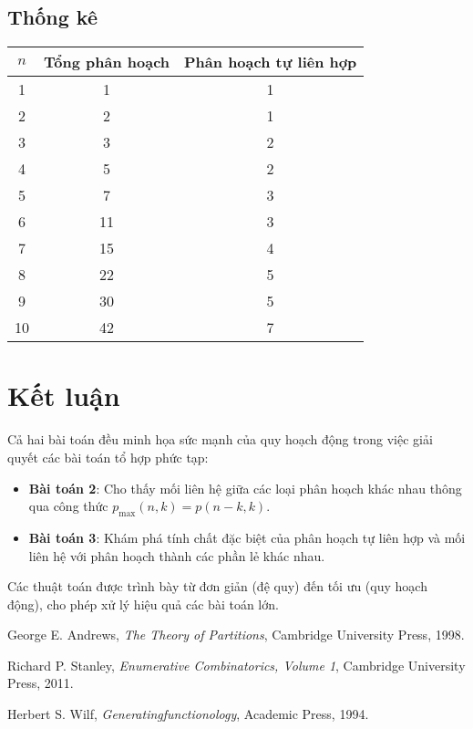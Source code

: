 \documentclass[12pt,a4paper]{article}
\theoremstyle{definition}
\begin{document}
\subsection{Thống kê}

\begin{center}
\begin{tabular}{|c|c|c|}
\hline
$n$ & Tổng phân hoạch & Phân hoạch tự liên hợp \\
\hline
1 & 1 & 1 \\
\hline
2 & 2 & 1 \\
\hline
3 & 3 & 2 \\
\hline
4 & 5 & 2 \\
\hline
5 & 7 & 3 \\
\hline
6 & 11 & 3 \\
\hline
7 & 15 & 4 \\
\hline
8 & 22 & 5 \\
\hline
9 & 30 & 5 \\
\hline
10 & 42 & 7 \\
\hline
\end{tabular}
\end{center}

\section{Kết luận}

Cả hai bài toán đều minh họa sức mạnh của quy hoạch động trong việc giải quyết các bài toán tổ hợp phức tạp:

\begin{itemize}
\item \textbf{Bài toán 2}: Cho thấy mối liên hệ giữa các loại phân hoạch khác nhau thông qua công thức $p_{\max}(n,k) = p(n-k, k)$.

\item \textbf{Bài toán 3}: Khám phá tính chất đặc biệt của phân hoạch tự liên hợp và mối liên hệ với phân hoạch thành các phần lẻ khác nhau.
\end{itemize}

Các thuật toán được trình bày từ đơn giản (đệ quy) đến tối ưu (quy hoạch động), cho phép xử lý hiệu quả các bài toán lớn.

\begin{thebibliography}{9}
George E. Andrews, \textit{The Theory of Partitions}, Cambridge University Press, 1998.

Richard P. Stanley, \textit{Enumerative Combinatorics, Volume 1}, Cambridge University Press, 2011.

Herbert S. Wilf, \textit{Generatingfunctionology}, Academic Press, 1994.
\end{thebibliography}
\end{document}
